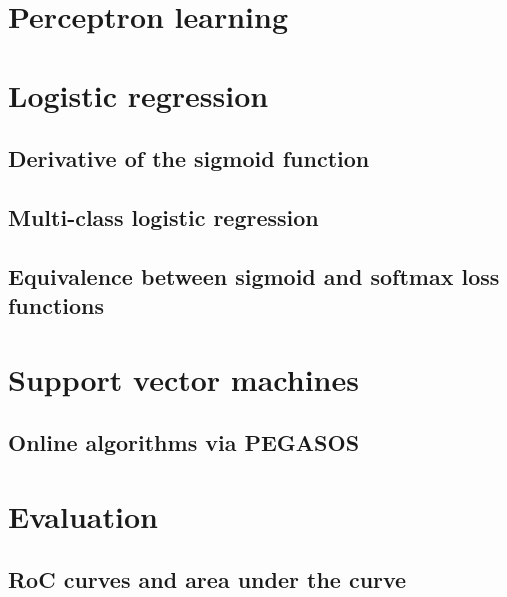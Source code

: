 \documentclass[12pt]{article}
\begin{document}
\section{Perceptron learning}

\section{Logistic regression}
\subsection{Derivative of the sigmoid function}

\subsection{Multi-class logistic regression}

\subsection{Equivalence between sigmoid and softmax loss functions}
\section{Support vector machines}
\subsection{Online algorithms via PEGASOS}
\section{Evaluation}
\subsection{RoC curves and area under the curve}
\end{document}
